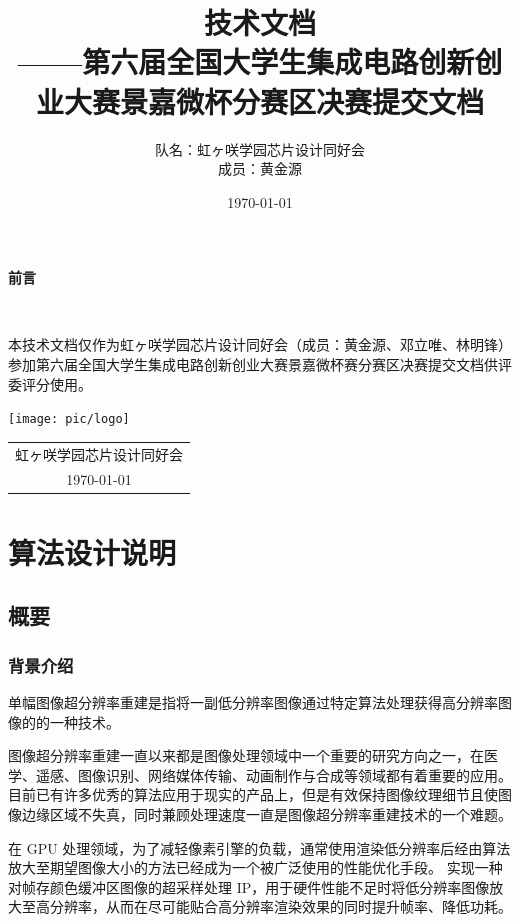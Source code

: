 \documentclass[12pt, a4paper, oneside]{ctexbook}
\title{{\Huge{\textbf{技术文档}}}\normalsize{\\——第六届全国大学生集成电路创新创业大赛景嘉微杯分赛区决赛提交文档}}
\author{队名：虹ヶ咲学园芯片设计同好会\\ 成员：黄金源\space邓立唯\space林明锋}
\date{\today}
\begin{document}
	
	
	
	\maketitle	
	\setcounter{page}{1}
	\begin{center}
		\Huge\textbf{前言}
	\end{center}~\
	
	本技术文档仅作为虹ヶ咲学园芯片设计同好会（成员：黄金源、邓立唯、林明锋）参加第六届全国大学生集成电路创新创业大赛景嘉微杯赛分赛区决赛提交文档供评委评分使用。
	~\\
	\begin{flushright}
		\texttt{[image: pic/logo]}\\
		\begin{tabular}{c}
			虹ヶ咲学园芯片设计同好会\\
			\today
		\end{tabular}
	\end{flushright}
	\newpage
	\setcounter{page}{1}
	\tableofcontents
	\newpage
	\setcounter{page}{1}
	
	\chapter{算法设计说明}
	\section{概要}
	\subsection{背景介绍}
	单幅图像超分辨率重建是指将一副低分辨率图像通过特定算法处理获得高分辨率图像的的一种技术。
	
	图像超分辨率重建一直以来都是图像处理领域中一个重要的研究方向之一，在医学、遥感、图像识别、网络媒体传输、动画制作与合成等领域都有着重要的应用。
	目前已有许多优秀的算法应用于现实的产品上，但是有效保持图像纹理细节且使图像边缘区域不失真，同时兼顾处理速度一直是图像超分辨率重建技术的一个难题。
	\par 在 GPU 处理领域，为了减轻像素引擎的负载，通常使用渲染低分辨率后经由算法放大至期望图像大小的方法已经成为一个被广泛使用的性能优化手段。
	实现一种对帧存颜色缓冲区图像的超采样处理 IP，用于硬件性能不足时将低分辨率图像放大至高分辨率，从而在尽可能贴合高分辨率渲染效果的同时提升帧率、降低功耗。
\end{document}
